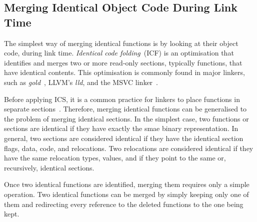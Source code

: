 
\subsection{Merging Identical Object Code During Link Time}

The simplest way of merging identical functions is by looking at their object code, during link time.
\textit{Identical code folding}~(ICF) is an optimisation that identifies and merges two or more read-only sections, typically functions, that have identical contents.
This optimisation is commonly found in major linkers, such as \textit{gold}~\cite{tallam10,kwan12}, LLVM's \textit{lld}, and the MSVC linker~\cite{msvc-icf}.

Before applying ICS, it is a common practice for linkers to place functions in separate sections~\cite{tallam10,kwan12}.
Therefore, merging identical functions can be generalised to the problem of merging identical sections.
In the simplest case, two functions or sections are identical if they have exactly the smae binary representation.
In general, two sections are considered identical if they have the identical section flags, data, code, and relocations.
Two relocations are considered identical if they have the same relocation types, values, and if they point to the same or, recursively, identical sections.


Once two identical functions are identified, merging them requires only a simple operation.
Two identical functions can be merged by simply keeping only one of them and redirecting every reference to the deleted functions to the one being kept.



